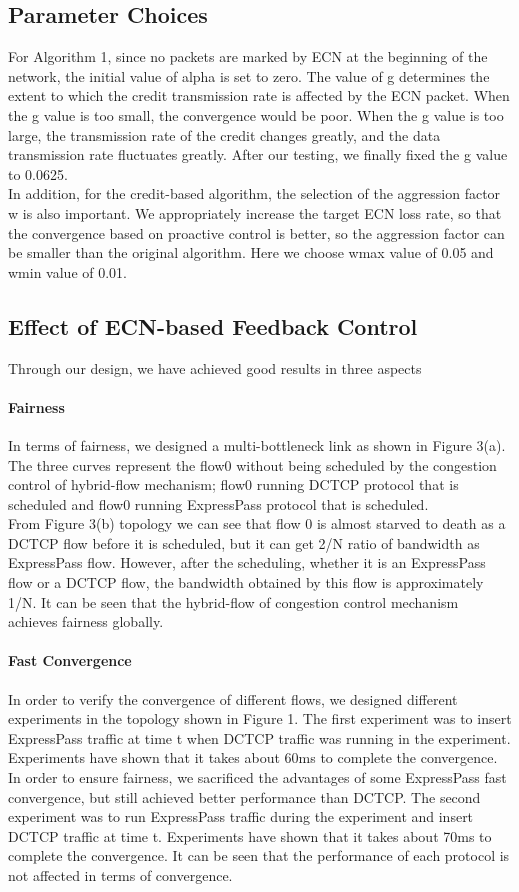 \documentclass[conference]{IEEEtran}
\begin{document}
\subsection{Parameter Choices}
For Algorithm 1, since no packets are marked by ECN at the beginning of the network, the initial value of alpha is set to zero. The value of g determines the extent to which the credit transmission rate is affected by the ECN packet. When the g value is too small, the convergence would be poor. When the g value is too large, the transmission rate of the credit changes greatly, and the data transmission rate fluctuates greatly. After our testing, we finally fixed the g value to 0.0625.\\
\indent In addition, for the credit-based algorithm, the selection of the aggression factor w is also important. We appropriately increase the target ECN loss rate, so that the convergence based on proactive control is better, so the aggression factor can be smaller than the original algorithm. Here we choose wmax value of 0.05 and wmin value of 0.01.

\subsection{Effect of ECN-based Feedback Control}
Through our design, we have achieved good results in three aspects
\paragraph{Fairness}In terms of fairness, we designed a multi-bottleneck link as shown in Figure 3(a). The three curves represent the flow0 without being scheduled by the congestion control of hybrid-flow mechanism; flow0 running DCTCP protocol that is scheduled and flow0 running ExpressPass protocol that is scheduled.\\
\indent From Figure 3(b) topology we can see that flow 0 is almost starved to death as a DCTCP flow before it is scheduled, but it can get 2/N ratio of bandwidth as ExpressPass flow. However, after the scheduling, whether it is an ExpressPass flow or a DCTCP flow, the bandwidth obtained by this flow is approximately 1/N. It can be seen that the hybrid-flow of congestion control mechanism achieves fairness globally.
\paragraph{Fast Convergence}In order to verify the convergence of different flows, we designed different experiments in the topology shown in Figure 1. The first experiment was to insert ExpressPass traffic at time t when DCTCP traffic was running in the experiment. Experiments have shown that it takes about 60ms to complete the convergence. In order to ensure fairness, we sacrificed the advantages of some ExpressPass fast convergence, but still achieved better performance than DCTCP. The second experiment was to run ExpressPass traffic during the experiment and insert DCTCP traffic at time t. Experiments have shown that it takes about 70ms to complete the convergence. It can be seen that the performance of each protocol is not affected in terms of convergence.
\end{document}
